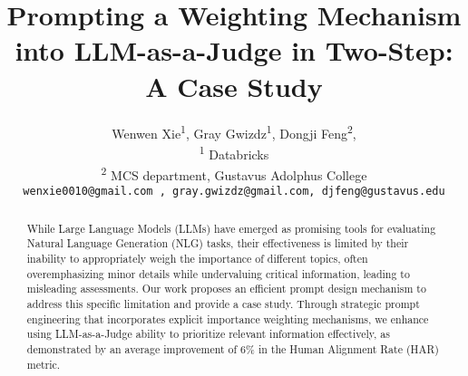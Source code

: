 \documentclass[11pt]{article}
\title{Prompting a Weighting Mechanism into LLM-as-a-Judge in Two-Step: A Case Study}
\author{Wenwen Xie\textsuperscript{1}, Gray Gwizdz\textsuperscript{1}, Dongji Feng\textsuperscript{2},\\
\textsuperscript{1} Databricks 
\\
\textsuperscript{2} MCS department, Gustavus Adolphus College\\
{\tt wenxie0010@gmail.com , gray.gwizdz@gmail.com, djfeng@gustavus.edu}}
\newcommand{\Dongji}[1]{{\textcolor{blue}{\bf [DJ: #1]}}}
\begin{document}
\maketitle
{}

\pagestyle{plain} %


\begin{abstract}


While Large Language Models (LLMs) have emerged as promising tools for evaluating Natural Language Generation (NLG) tasks, their effectiveness is limited by their inability to appropriately weigh the importance of different topics, often overemphasizing minor details while undervaluing critical information, leading to misleading assessments. Our work proposes an efficient prompt design mechanism to address this specific limitation and provide a case study. Through strategic prompt engineering that incorporates explicit importance weighting mechanisms, we enhance using LLM-as-a-Judge ability to prioritize relevant information effectively, as demonstrated by an average improvement of 6\% in the Human Alignment Rate (HAR) metric.

\end{abstract}


















\newpage

\end{document}
